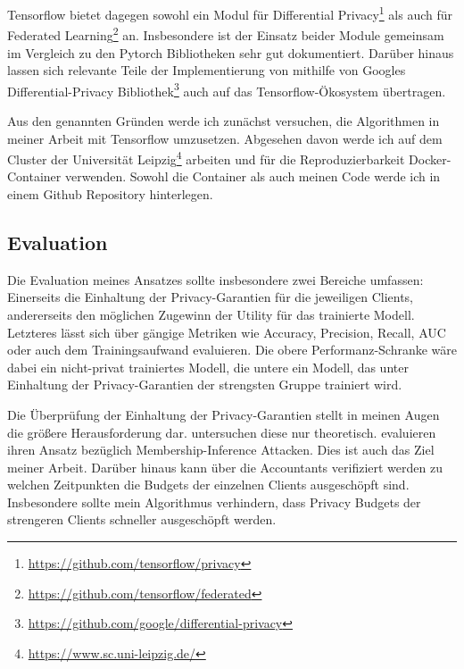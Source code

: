 Tensorflow bietet dagegen sowohl ein Modul für Differential Privacy\footnote{\url{https://github.com/tensorflow/privacy}} als auch für Federated Learning\footnote{\url{https://github.com/tensorflow/federated}} an. Insbesondere ist der Einsatz beider Module gemeinsam im Vergleich zu den Pytorch Bibliotheken sehr gut dokumentiert. Darüber hinaus lassen sich relevante Teile der Implementierung von \textcite{boenisch:2023} mithilfe von Googles Differential-Privacy Bibliothek\footnote{\url{https://github.com/google/differential-privacy}} auch auf das Tensorflow-Ökosystem übertragen.

Aus den genannten Gründen werde ich zunächst versuchen, die Algorithmen in meiner Arbeit mit Tensorflow umzusetzen. Abgesehen davon werde ich auf dem Cluster der Universität Leipzig\footnote{\url{https://www.sc.uni-leipzig.de/}} arbeiten und für die Reproduzierbarkeit Docker-Container verwenden. Sowohl die Container als auch meinen Code werde ich in einem Github Repository hinterlegen.

\subsection{Evaluation}
Die Evaluation meines Ansatzes sollte insbesondere zwei Bereiche umfassen: Einerseits die Einhaltung der Privacy-Garantien für die jeweiligen Clients, andererseits den möglichen Zugewinn der Utility für das trainierte Modell. Letzteres lässt sich über gängige Metriken wie Accuracy, Precision, Recall, AUC oder auch dem Trainingsaufwand evaluieren. Die obere Performanz-Schranke wäre dabei ein nicht-privat trainiertes Modell, die untere ein Modell, das unter Einhaltung der Privacy-Garantien der strengsten Gruppe trainiert wird.

Die Überprüfung der Einhaltung der Privacy-Garantien stellt in meinen Augen die größere Herausforderung dar. \textcite{aldaghri:2023} untersuchen diese nur theoretisch. \textcite{boenisch:2023} evaluieren ihren Ansatz bezüglich Membership-Inference Attacken. Dies ist auch das Ziel meiner Arbeit. Darüber hinaus kann über die Accountants verifiziert werden zu welchen Zeitpunkten die Budgets der einzelnen Clients ausgeschöpft sind. Insbesondere sollte mein Algorithmus verhindern, dass Privacy Budgets der strengeren Clients schneller ausgeschöpft werden.

